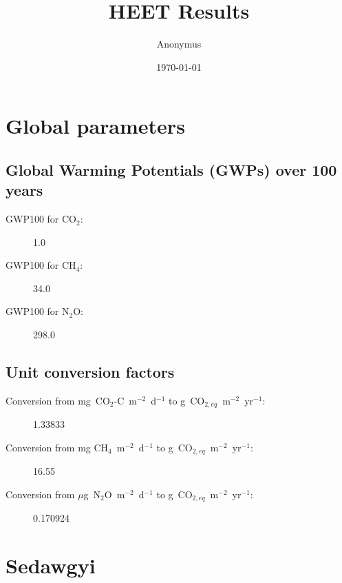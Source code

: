\documentclass{article}%
\title{HEET Results}%
\author{Anonymus}%
\date{\today}%
\begin{document}
%
\normalsize%
\pagestyle{header}%
\maketitle%
\section{Global parameters}%
\label{sec:Globalparameters}%
\subsection{Global Warming Potentials (GWPs) over 100 years}%
\label{subsec:GlobalWarmingPotentials(GWPs)over100years}%
\begin{description}%
\item[GWP100 for CO$_2$: ]%
1.0%
\item[GWP100 for CH$_4$: ]%
34.0%
\item[GWP100 for N$_2$O: ]%
298.0%
\end{description}

%
\subsection{Unit conversion factors}%
\label{subsec:Unitconversionfactors}%
\begin{description}%
\item[Conversion from mg~CO$_2$-C~m$^{-2}$~d$^{-1}$ to g~CO$_{2,eq}$~m$^{-2}$~yr$^{-1}$: ]%
\num[round-precision=4,round-mode=figures]{1.33833}%
\end{description}%
\begin{description}%
\item[Conversion from mg CH$_4$~m$^{-2}$~d$^{-1}$ to g~CO$_{2,eq}$~m$^{-2}$~yr$^{-1}$: ]%
\num[round-precision=4,round-mode=figures]{16.55}%
\end{description}%
\begin{description}%
\item[Conversion from $\mu$g~N$_2$O~m$^{-2}$~d$^{-1}$ to g~CO$_{2,eq}$~m$^{-2}$~yr$^{-1}$: ]%
\num[round-precision=4,round-mode=figures]{0.170924}%
\end{description}

%
\pagebreak%
\section{Sedawgyi}%
\label{sec:Sedawgyi}%
\end{document}
